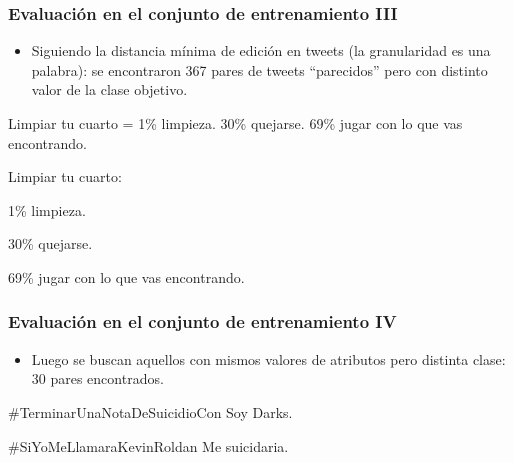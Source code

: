\begin{frame}
    \frametitle{Evaluación en el conjunto de entrenamiento III}

    \begin{itemize}
        \item Siguiendo la distancia mínima de edición en tweets (la granularidad es una palabra): se encontraron 367 pares de tweets ``parecidos'' pero con distinto valor de la clase objetivo.
    \end{itemize}

    \begin{example}
        Limpiar tu cuarto = 1\% limpieza. 30\% quejarse. 69\% jugar con lo que vas encontrando.
    \end{example}

    \begin{example}
        Limpiar tu cuarto:

        1\% limpieza.

        30\% quejarse.

        69\% jugar con lo que vas encontrando.
    \end{example}
\end{frame}

\begin{frame}
    \frametitle{Evaluación en el conjunto de entrenamiento IV}

    \begin{itemize}
        \item Luego se buscan aquellos con mismos valores de atributos pero distinta clase: 30 pares encontrados.
    \end{itemize}

    \begin{example}
        \#TerminarUnaNotaDeSuicidioCon Soy Darks.
    \end{example}

    \begin{example}
        \#SiYoMeLlamaraKevinRoldan Me suicidaria.
    \end{example}
\end{frame}

